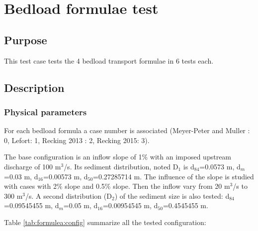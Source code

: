 \chapter{Bedload formulae test}\label{chapter:Bedload formulae test}

\section{Purpose}

This test case tests the 4 bedload transport formulae in 6 tests each.

\section{Description}

\subsection{Physical parameters}

For each bedload formula a case number is associated
(Meyer-Peter and Muller \cite{meyer1948formulas}: 0, Lefort: 1,
Recking 2013 \cite{recking2013simple}: 2, Recking 2015: 3).

The base configuration is an inflow slope of 1\% with an imposed
upstream discharge of 100 m$^3$/s. Its sediment distribution, noted D$_1$ is
d$_{84}$=0.0573 m, d$_m$=0.03 m, d$_{16}$=0.00573 m,
d$_{50}$=0.27285714 m.
The influence of the slope is studied with cases with 2\% slope and
0.5\% slope.
Then the inflow vary from 20 m$^3$/s to 300 m$^3$/s.
A second distribution (D$_2$) of the sediment size is also tested:
d$_{84}$=0.09545455 m, d$_m$=0.05 m, d$_{16}$=0.00954545 m,
d$_{50}$=0.4545455 m.

Table \ref{tab:formulea:config} summarize all the tested configuration:

